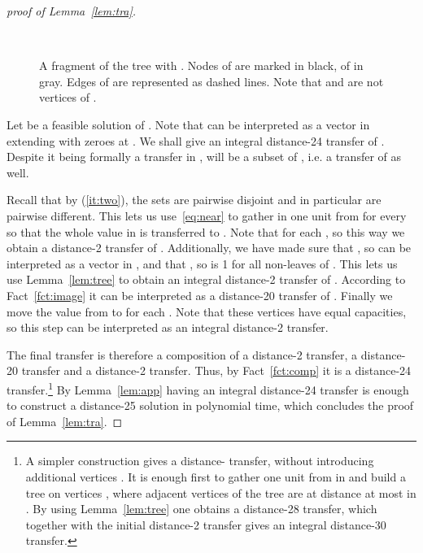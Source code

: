 \documentclass{article}
\theoremstyle{plain}
\theoremstyle{definition}
\begin{document}
\begin{proof}[proof of Lemma~\ref{lem:tra}]
\begin{figure}
\begin{center}
\end{center}
\caption{\label{fig:tree}
A fragment of the tree  with . Nodes of  are
marked in black, of  in gray. Edges of  are represented as dashed lines.
Note that  and  are not vertices of .}\
\end{figure}
 Let  be a feasible solution of . Note that 
can be interpreted as a vector in  extending with zeroes at .
We shall give an integral distance-24 transfer  of .
Despite it being formally a transfer in ,  will be a subset of , i.e. a
transfer of   as well.

Recall that by (\ref{it:two}), the sets
 are pairwise disjoint and in particular  are pairwise different. 
This lets us use~\eqref{eq:near} to gather in  one unit from  for
every  so that the whole value in 
is transferred to .
Note that  for each , so
this way we obtain a distance-2 transfer  of . Additionally, we
have made sure that , so  can be interpreted as a vector in
, and that , so  is 1 for all non-leaves of
. This lets us use Lemma~\ref{lem:tree} to obtain an integral distance-2 transfer  of . According to
Fact~\ref{fct:image} it can be interpreted as a distance-20 transfer of
. Finally we move the value from  to  for each .
Note that these vertices have equal capacities, so this step can be interpreted
as an integral distance-2 transfer.

The final transfer is therefore a composition
of a distance-2 transfer, a distance-20 transfer and a distance-2 transfer.
Thus, by Fact~\ref{fct:comp} it is a distance-24 transfer.\footnote{A simpler
construction gives a distance- transfer, without introducing additional
vertices . It is enough first to gather one unit from  in  and build 
a tree on vertices , where adjacent vertices of the tree are at distance
at most  in . By using Lemma~\ref{lem:tree} one obtains a distance-28 transfer,
which together with the initial distance-2 transfer gives an integral distance-30 transfer.}
By Lemma~\ref{lem:app} having an integral distance-24 transfer
is enough to construct a distance-25 solution  in polynomial time,
which concludes the proof of Lemma~\ref{lem:tra}.
\end{proof}
\end{document}
